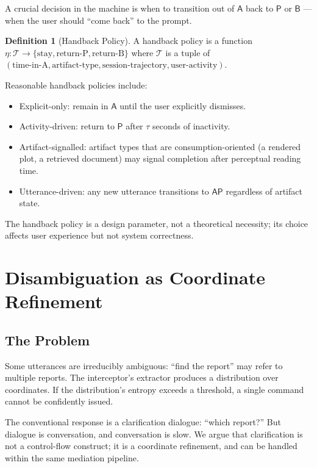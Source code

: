 \documentclass[11pt,a4paper]{article}
\theoremstyle{definition}
\newtheorem{definition}[theorem]{Definition}
\theoremstyle{remark}
\begin{document}
A crucial decision in the machine is when to transition out of $\mathsf{A}$ back to $\mathsf{P}$ or $\mathsf{B}$ --- when the user should ``come back'' to the prompt.

\begin{definition}[Handback Policy]
A handback policy is a function $\eta: \mathcal{T} \to \{\text{stay}, \text{return-P}, \text{return-B}\}$ where $\mathcal{T}$ is a tuple of $(\text{time-in-A}, \text{artifact-type}, \text{session-trajectory}, \text{user-activity})$.
\end{definition}

Reasonable handback policies include:
\begin{itemize}
    \item Explicit-only: remain in $\mathsf{A}$ until the user explicitly dismisses.
    \item Activity-driven: return to $\mathsf{P}$ after $\tau$ seconds of inactivity.
    \item Artifact-signalled: artifact types that are consumption-oriented (a rendered plot, a retrieved document) may signal completion after perceptual reading time.
    \item Utterance-driven: any new utterance transitions to $\mathsf{AP}$ regardless of artifact state.
\end{itemize}

The handback policy is a design parameter, not a theoretical necessity; its choice affects user experience but not system correctness.

\section{Disambiguation as Coordinate Refinement}
\label{sec:disambig}

\subsection{The Problem}

Some utterances are irreducibly ambiguous: ``find the report'' may refer to multiple reports. The interceptor's extractor produces a distribution over coordinates. If the distribution's entropy exceeds a threshold, a single command cannot be confidently issued.

The conventional response is a clarification dialogue: ``which report?'' But dialogue is conversation, and conversation is slow. We argue that clarification is not a control-flow construct; it is a coordinate refinement, and can be handled within the same mediation pipeline.
\end{document}
